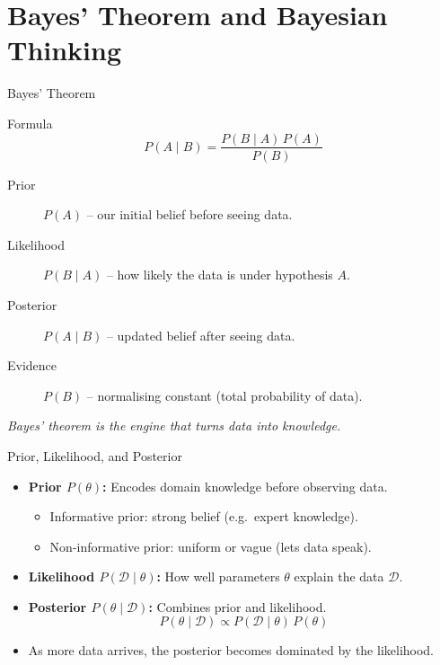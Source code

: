 \section{Bayes' Theorem and Bayesian Thinking}

\begin{frame}{Bayes' Theorem}
\begin{block}{Formula}
\[
\boxed{P(A \mid B) = \frac{P(B \mid A)\, P(A)}{P(B)}}
\]
\end{block}
\vspace{4pt}
\begin{description}
    \item[Prior] $P(A)$ -- our initial belief before seeing data.
    \item[Likelihood] $P(B \mid A)$ -- how likely the data is under hypothesis $A$.
    \item[Posterior] $P(A \mid B)$ -- updated belief after seeing data.
    \item[Evidence] $P(B)$ -- normalising constant (total probability of data).
\end{description}
\vspace{4pt}
\centering
\textit{Bayes' theorem is the engine that turns data into knowledge.}
\end{frame}

\begin{frame}{Prior, Likelihood, and Posterior}
\begin{itemize}
    \item \textbf{Prior $P(\theta)$:} Encodes domain knowledge before observing data.
    \begin{itemize}
        \item Informative prior: strong belief (e.g.\ expert knowledge).
        \item Non-informative prior: uniform or vague (lets data speak).
    \end{itemize}
    \item \textbf{Likelihood $P(\mathcal{D} \mid \theta)$:} How well parameters $\theta$ explain the data $\mathcal{D}$.
    \item \textbf{Posterior $P(\theta \mid \mathcal{D})$:} Combines prior and likelihood.
    \[
        P(\theta \mid \mathcal{D}) \propto P(\mathcal{D} \mid \theta)\, P(\theta)
    \]
    \item As more data arrives, the posterior becomes dominated by the likelihood.
\end{itemize}
\end{frame}

